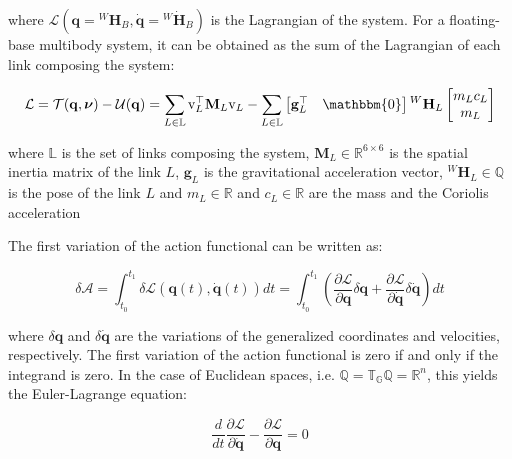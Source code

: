 where $\mathcal{L} (\mathbf{q} = {}^W\mathbf{H} _B, \dot{\mathbf{q}} = {}^W\dot{\mathbf{H}} _B)$ is the Lagrangian of the system. For a floating-base multibody system, it can be obtained as the sum of the Lagrangian of each link composing the system:

\begin{equation}
    \mathcal{L} = \mathcal{T}(\mathbf{q},\boldsymbol{\nu}) - \mathcal{U}(\mathbf{q}) = \sum _{L \in \mathbb{L}} \mathrm{v} ^\top _L \mathbf{M} _L \mathrm{v} _L - \sum _{L \in \mathbb{L}} \begin{bmatrix}
        \mathbf{g} ^\top _L & \mathbbm{0}
    \end{bmatrix} {}^W\mathbf{H} _L
    \begin{bmatrix}
        m _L c _L \\ m _L
    \end{bmatrix}
\end{equation}

where $\mathbb{L}$ is the set of links composing the system, $\mathbf{M} _L \in \mathbb{R} ^{6 \times 6}$ is the spatial inertia matrix of the link $L$, $\mathbf{g} _L$ is the gravitational acceleration vector, ${}^W\mathbf{H} _L \in \mathbb{Q}$ is the pose of the link $L$ and $m _L \in \mathbb{R}$ and $c _L \in \mathbb{R}$ are the mass and the Coriolis acceleration

The first variation of the action functional can be written as:

\begin{equation}
    \delta \mathcal{A} = \int _{t _0} ^{t _1} \delta \mathcal{L} (\mathbf{q}(t), \mathbf{\dot{q}}(t))dt = \int _{t _0} ^{t _1} \left( \frac{\partial \mathcal{L}}{\partial \mathbf{q}} \delta \mathbf{q} + \frac{\partial \mathcal{L}}{\partial \mathbf{\dot{q}}} \delta \mathbf{\dot{q}} \right) dt
\end{equation}

where $\delta \mathbf{q}$ and $\delta \mathbf{\dot{q}}$ are the variations of the generalized coordinates and velocities, respectively. The first variation of the action functional is zero if and only if the integrand is zero. In the case of Euclidean spaces, i.e. $\mathbb{Q} = \mathbb{T} _{\mathbb{G}}\mathbb{Q} =\mathbb{R} ^n$, this yields the Euler-Lagrange equation:

\begin{equation}
    \frac{d}{dt} \frac{\partial \mathcal{L}}{\partial \mathbf{\dot{q}}} - \frac{\partial \mathcal{L}}{\partial \mathbf{q}} = 0
    \label{eqn:lagrangian}
\end{equation}

